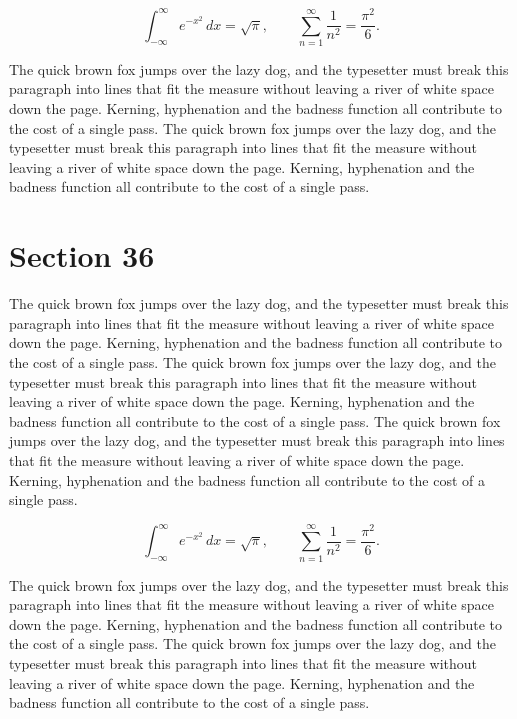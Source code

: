 \documentclass{article}
\begin{document}
\begin{equation}
\int_{-\infty}^{\infty} e^{-x^{2}}\,dx = \sqrt{\pi}, \qquad
\sum_{n=1}^{\infty} \frac{1}{n^{2}} = \frac{\pi^{2}}{6}.
\end{equation}

The quick brown fox jumps over the lazy dog, and the typesetter must break this paragraph into lines that fit the measure without leaving a river of white space down the page. Kerning, hyphenation and the badness function all contribute to the cost of a single pass. The quick brown fox jumps over the lazy dog, and the typesetter must break this paragraph into lines that fit the measure without leaving a river of white space down the page. Kerning, hyphenation and the badness function all contribute to the cost of a single pass. 
\section{Section 36}
The quick brown fox jumps over the lazy dog, and the typesetter must break this paragraph into lines that fit the measure without leaving a river of white space down the page. Kerning, hyphenation and the badness function all contribute to the cost of a single pass. The quick brown fox jumps over the lazy dog, and the typesetter must break this paragraph into lines that fit the measure without leaving a river of white space down the page. Kerning, hyphenation and the badness function all contribute to the cost of a single pass. The quick brown fox jumps over the lazy dog, and the typesetter must break this paragraph into lines that fit the measure without leaving a river of white space down the page. Kerning, hyphenation and the badness function all contribute to the cost of a single pass. 

\begin{equation}
\int_{-\infty}^{\infty} e^{-x^{2}}\,dx = \sqrt{\pi}, \qquad
\sum_{n=1}^{\infty} \frac{1}{n^{2}} = \frac{\pi^{2}}{6}.
\end{equation}

The quick brown fox jumps over the lazy dog, and the typesetter must break this paragraph into lines that fit the measure without leaving a river of white space down the page. Kerning, hyphenation and the badness function all contribute to the cost of a single pass. The quick brown fox jumps over the lazy dog, and the typesetter must break this paragraph into lines that fit the measure without leaving a river of white space down the page. Kerning, hyphenation and the badness function all contribute to the cost of a single pass. 
\end{document}
